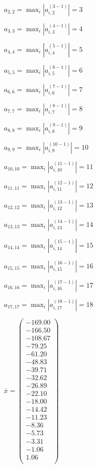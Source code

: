 \documentclass[a4paper,12pt]{article}
\begin{document}
$a _{ 2, 2 } =  \max _i |a _{ i, 2 } ^{ (3 - 1) } | = 3$

$a _{ 3, 3 } =  \max _i |a _{ i, 3 } ^{ (4 - 1) } | = 4$

$a _{ 4, 4 } =  \max _i |a _{ i, 4 } ^{ (5 - 1) } | = 5$

$a _{ 5, 5 } =  \max _i |a _{ i, 5 } ^{ (6 - 1) } | = 6$

$a _{ 6, 6 } =  \max _i |a _{ i, 6 } ^{ (7 - 1) } | = 7$

$a _{ 7, 7 } =  \max _i |a _{ i, 7 } ^{ (8 - 1) } | = 8$

$a _{ 8, 8 } =  \max _i |a _{ i, 8 } ^{ (9 - 1) } | = 9$

$a _{ 9, 9 } =  \max _i |a _{ i, 9 } ^{ (10 - 1) } | = 10$

$a _{ 10, 10 } =  \max _i |a _{ i, 10 } ^{ (11 - 1) } | = 11$

$a _{ 11, 11 } =  \max _i |a _{ i, 11 } ^{ (12 - 1) } | = 12$

$a _{ 12, 12 } =  \max _i |a _{ i, 12 } ^{ (13 - 1) } | = 13$

$a _{ 13, 13 } =  \max _i |a _{ i, 13 } ^{ (14 - 1) } | = 14$

$a _{ 14, 14 } =  \max _i |a _{ i, 14 } ^{ (15 - 1) } | = 15$

$a _{ 15, 15 } =  \max _i |a _{ i, 15 } ^{ (16 - 1) } | = 16$

$a _{ 16, 16 } =  \max _i |a _{ i, 16 } ^{ (17 - 1) } | = 17$

$a _{ 17, 17 } =  \max _i |a _{ i, 17 } ^{ (18 - 1) } | = 18$

$\bar { x } = \begin{pmatrix}
-169.00 \\
-166.50 \\
-108.67 \\
-79.25 \\
-61.20 \\
-48.83 \\
-39.71 \\
-32.62 \\
-26.89 \\
-22.10 \\
-18.00 \\
-14.42 \\
-11.23 \\
-8.36 \\
-5.73 \\
-3.31 \\
-1.06 \\
1.06 \\
\end{pmatrix}
$
\end{document}
